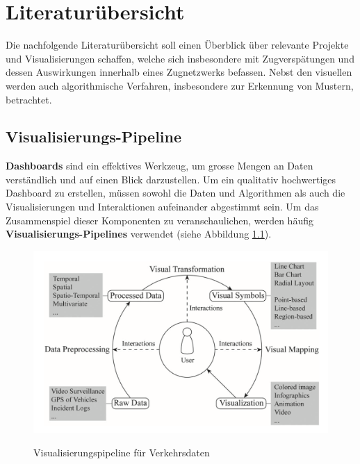 \chapter{Literaturübersicht}
\label{kap:literaturübersicht}
Die nachfolgende Literaturübersicht soll einen Überblick über relevante Projekte und Visualisierungen schaffen, welche sich insbesondere mit Zugverspätungen und dessen Auswirkungen innerhalb eines Zugnetzwerks befassen. Nebst den visuellen werden auch algorithmische Verfahren, insbesondere zur Erkennung von Mustern, betrachtet.

\section{Visualisierungs-Pipeline}
\textbf{Dashboards} sind ein effektives Werkzeug, um grosse Mengen an Daten verständlich und auf einen Blick darzustellen. Um ein qualitativ hochwertiges Dashboard zu erstellen, müssen sowohl die Daten und Algorithmen als auch die Visualisierungen und Interaktionen aufeinander abgestimmt sein. Um das Zusammenspiel dieser Komponenten zu veranschaulichen, werden häufig \textbf{Visualisierungs-Pipelines} verwendet (siehe Abbildung \ref{fig_pipeline_traffic_visualization}).

\begin{figure}[H]
    \caption{Visualisierungspipeline für Verkehrsdaten \parencite[S. 2971]{survey_traffic_data_visualization_2015}}
    \includegraphics[width=.8\linewidth]{content/00_assets/traffic_visualization_pipeline.png}
    \label{fig_pipeline_traffic_visualization}
\end{figure}

